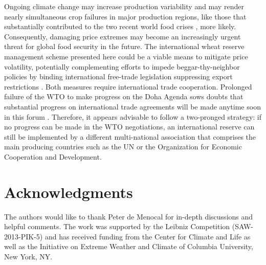 \documentclass[12pt]{article}
\begin{document}
Ongoing climate change may increase production variability \cite{WHE13} and may render nearly simultaneous crop failures in major production regions, like those that substantially contributed to the two recent world food crises \cite{ASS11,CHA14}, more likely. Consequently, damaging price extremes may become an increasingly urgent threat for global food security in the future. The international wheat reserve management scheme presented here could be a viable means to mitigate price volatility, potentially complementing efforts to impede beggar-thy-neighbor policies by binding international free-trade legislation suppressing export restrictions \cite{ANA13}. Both measures require international trade cooperation. Prolonged failure of the WTO to make progress on the Doha Agenda sows doubts that substantial progress on international trade agreements will be made anytime soon in this forum \cite{HLPE11}. Therefore, it appears advisable to follow a two-pronged strategy: if no progress can be made in the WTO negotiations, an international reserve can still be implemented by a different multi-national association that comprises the main producing countries such as the UN or the Organization for Economic Cooperation and Development.





\section*{Acknowledgments}
The authors would like to thank Peter de Menocal for in-depth discussions and helpful comments. The
work was supported by the Leibniz Competition (SAW-2013-PIK-5) and has received funding from the
Center for Climate and Life as well as the Initiative on Extreme Weather and Climate of Columbia
University, New York, NY.
\end{document}
